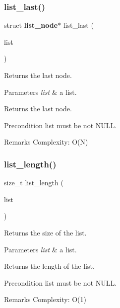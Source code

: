 \subsubsection{list\+\_\+last()}
{\footnotesize\ttfamily struct \textbf{ list\+\_\+node}$\ast$ list\+\_\+last (\begin{DoxyParamCaption}\item[{const struct \textbf{ list} $\ast$}]{list }\end{DoxyParamCaption})}

Returns the last node.


\begin{DoxyParams}{Parameters}
{\em list} & a list. \\
\hline
\end{DoxyParams}
\begin{DoxyReturn}{Returns}
the last node.
\end{DoxyReturn}
\begin{DoxyPrecond}{Precondition}
{\ttfamily list} must be not N\+U\+LL.
\end{DoxyPrecond}
\begin{DoxyRemark}{Remarks}
Complexity\+: O(\+N) 
\end{DoxyRemark}
\mbox{\label{list_8c_a5ded68cde03f48a724bb04326dc5cc87}} 
\subsubsection{list\+\_\+length()}
{\footnotesize\ttfamily size\+\_\+t list\+\_\+length (\begin{DoxyParamCaption}\item[{const struct \textbf{ list} $\ast$}]{list }\end{DoxyParamCaption})\hspace{0.3cm}{\ttfamily [inline]}}

Returns the size of the list.


\begin{DoxyParams}{Parameters}
{\em list} & a list. \\
\hline
\end{DoxyParams}
\begin{DoxyReturn}{Returns}
the length of the list.
\end{DoxyReturn}
\begin{DoxyPrecond}{Precondition}
{\ttfamily list} must be not N\+U\+LL.
\end{DoxyPrecond}
\begin{DoxyRemark}{Remarks}
Complexity\+: O(1) 
\end{DoxyRemark}
\mbox{\label{list_8c_aa2253e2e4f2da4eb7a3b17759369dcd7}} 
